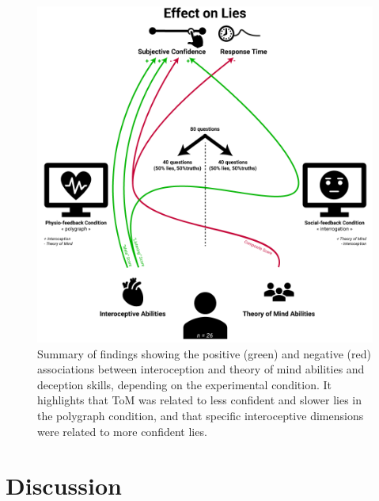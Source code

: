\documentclass[
  man,mask,floatsintext]{apa6}
\begin{document}
\begin{figure}
\includegraphics[width=1\linewidth]{../figures/figure2} \caption{Summary of findings showing the positive (green) and negative (red) associations between interoception and theory of mind abilities and deception skills, depending on the experimental condition. It highlights that ToM was related to less confident and slower lies in the polygraph condition, and that specific interoceptive dimensions were related to more confident lies.}\label{fig:unnamed-chunk-2}
\end{figure}

\section{Discussion}\label{discussion}
\end{document}
